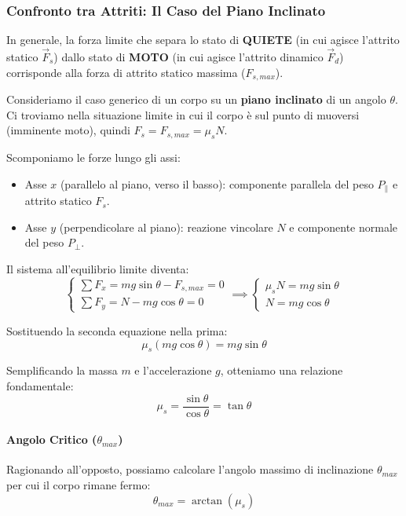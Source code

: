 
\subsubsection{Confronto tra Attriti: Il Caso del Piano Inclinato}
In generale, la forza limite che separa lo stato di \textbf{QUIETE} (in cui agisce l'attrito statico $\vec{F}_s$) dallo stato di \textbf{MOTO} (in cui agisce l'attrito dinamico $\vec{F}_d$) corrisponde alla forza di attrito statico massima ($F_{s,max}$).

Consideriamo il caso generico di un corpo su un \textbf{piano inclinato} di un angolo $\theta$. Ci troviamo nella situazione limite in cui il corpo è sul punto di muoversi (imminente moto), quindi $F_s = F_{s,max} = \mu_s N$.

Scomponiamo le forze lungo gli assi:
\begin{itemize}
    \item Asse $x$ (parallelo al piano, verso il basso): componente parallela del peso $P_{\parallel}$ e attrito statico $F_s$.
    \item Asse $y$ (perpendicolare al piano): reazione vincolare $N$ e componente normale del peso $P_{\perp}$.
\end{itemize}

Il sistema all'equilibrio limite diventa:
\begin{equation}
\begin{cases}
    \sum F_x = m g \sin\theta - F_{s,max} = 0 \\
    \sum F_y = N - m g \cos\theta = 0
\end{cases}
\implies
\begin{cases}
    \mu_s N = m g \sin\theta \\
    N = m g \cos\theta
\end{cases}
\end{equation}

Sostituendo la seconda equazione nella prima:
\[ \mu_s (mg \cos\theta) = mg \sin\theta \]

Semplificando la massa $m$ e l'accelerazione $g$, otteniamo una relazione fondamentale:
\begin{equation}
    \mu_s = \frac{\sin\theta}{\cos\theta} = \tan\theta
\end{equation}

\paragraph{Angolo Critico ($\theta_{max}$)}
Ragionando all'opposto, possiamo calcolare l'angolo massimo di inclinazione $\theta_{max}$ per cui il corpo rimane fermo:
\[ \theta_{max} = \arctan(\mu_s) \]

